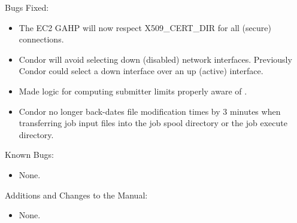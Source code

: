 \noindent Bugs Fixed:

\begin{itemize}

\item The EC2 GAHP will now respect X509\_CERT\_DIR for all (secure) connections.

\item Condor will avoid selecting down (disabled) network interfaces.  Previously Condor could select a down interface over an up (active) interface.

\item Made  logic for computing submitter limits properly aware of .

\item Condor no longer back-dates file modification times by 3 minutes
when transferring job input files into the job spool directory or the job
execute directory.

\end{itemize}

\noindent Known Bugs:

\begin{itemize}

\item None.

\end{itemize}

\noindent Additions and Changes to the Manual:

\begin{itemize}

\item None.

\end{itemize}


